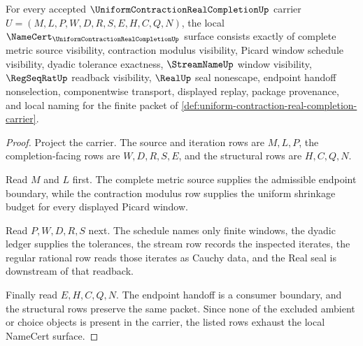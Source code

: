 \begin{theorem}
\label{thm:uniform-contraction-real-completion-namecert-obligations}
For every accepted $\UniformContractionRealCompletionUp$ carrier $U=(M,L,P,W,D,R,S,E,H,C,Q,N)$, the local $\NameCert_{\UniformContractionRealCompletionUp}$ surface consists exactly of complete metric source visibility, contraction modulus visibility, Picard window schedule visibility, dyadic tolerance exactness, $\StreamNameUp$ window visibility, $\RegSeqRatUp$ readback visibility, $\RealUp$ seal nonescape, endpoint handoff nonselection, componentwise transport, displayed replay, package provenance, and local naming for the finite packet of \autoref{def:uniform-contraction-real-completion-carrier}.
\end{theorem}
\begin{proof}
Project the carrier. The source and iteration rows are $M,L,P$, the completion-facing rows are $W,D,R,S,E$, and the structural rows are $H,C,Q,N$.

Read $M$ and $L$ first. The complete metric source supplies the admissible endpoint boundary, while the contraction modulus row supplies the uniform shrinkage budget for every displayed Picard window.

Read $P,W,D,R,S$ next. The schedule names only finite windows, the dyadic ledger supplies the tolerances, the stream row records the inspected iterates, the regular rational row reads those iterates as Cauchy data, and the Real seal is downstream of that readback.

Finally read $E,H,C,Q,N$. The endpoint handoff is a consumer boundary, and the structural rows preserve the same packet. Since none of the excluded ambient or choice objects is present in the carrier, the listed rows exhaust the local NameCert surface.
\end{proof}

